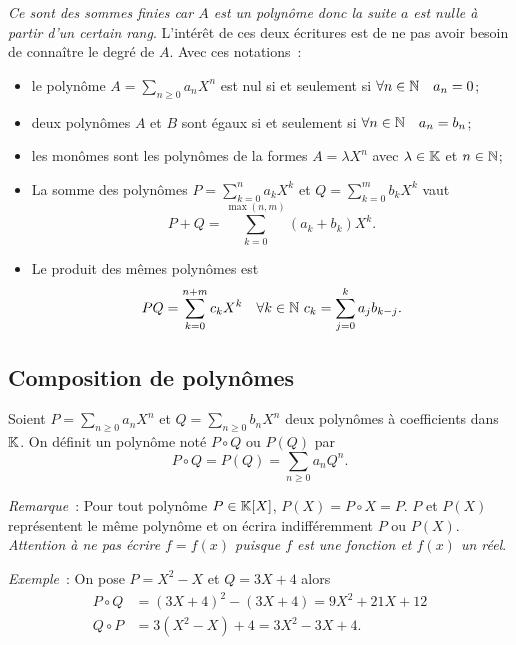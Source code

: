\emph{Ce sont des sommes finies car \(A\) est un polynôme donc la suite \(a\)
est nulle à partir d'un certain rang}. L'intérêt de ces deux écritures est de ne
pas avoir besoin de connaître le degré de \(A\). Avec ces notations~:
\begin{itemize}
  \item le polynôme \(A = \sum_{n\geqslant 0} a_n X^n\) est nul si et seulement si
    \(\forall n \in \mathbb{N} \quad a_n =0\);
  \item deux polynômes \(A\) et \(B\) sont égaux si et seulement si \(\forall n
    \in \mathbb{N} \quad a_n =b_n\);
  \item les monômes sont les polynômes de la formes \(A = \lambda X^n\) avec
    \(\lambda \in \mathbb{K}\) et \(n \in \mathbb{N}\);
  \item La somme des polynômes \(P = \sum_{k = 0}^n a_k X^k\) et \(Q = \sum_{k = 0}^m
    b_k X^k\) vaut
    \begin{equation}
      P+Q = \sum_{k = 0}^{\max(n,m)}(a_k+b_k) X^k.
    \end{equation}
  \item Le produit des mêmes polynômes est
    \begin{equation}
      PQ = \sum_{k = 0}^{n+m} c_k X^k \quad \forall k \in \mathbb{N} \ c_k = \sum_{j = 0}^k
      a_j b_{k-j}.
    \end{equation}
\end{itemize}

\subsection{Composition de polynômes}

\begin{defdef}
  Soient \(P = \sum_{n \geqslant 0} a_n X^n\) et \(Q = \sum_{n \geqslant 0} b_n
  X^n\) deux polynômes à coefficients dans \(\mathbb{K}\). On définit un polynôme noté
  \(P \circ Q\) ou \(P(Q)\) par
  \begin{equation}
    P \circ Q = P(Q) = \sum_{n \geqslant 0} a_n Q^n.
  \end{equation}
\end{defdef}

\emph{Remarque}~: Pour tout polynôme \(P \in \mathbb{K}[X]\), \(P(X) = P \circ X = P\).
\(P\) et \(P(X)\) représentent le même polynôme et on écrira indifféremment
\(P\) ou \(P(X)\). \emph{Attention à ne pas écrire \(f = f(x)\) puisque \(f\) est
une fonction et \(f(x)\) un réel}.

\emph{Exemple}~: On pose \(P = X^2-X\) et \(Q = 3X+4\) alors
\begin{align}
  P \circ Q &= (3X+4)^2-(3X+4) = 9X^2+21X+12\\
  Q \circ P &= 3(X^2-X)+4 = 3X^2-3X+4.
\end{align}

